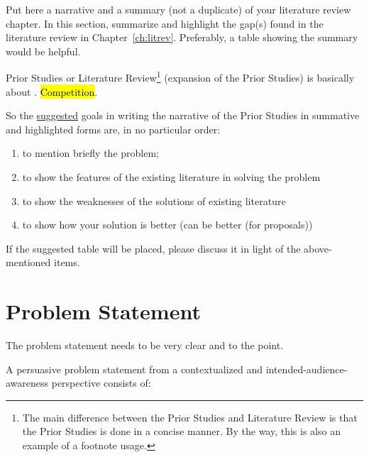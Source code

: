 Put here a narrative and a summary (not a duplicate) of your literature review chapter.  In this section, summarize and highlight the gap(s) found in the literature review in Chapter~\ref{ch:litrev}. Preferably, a table showing the summary would be helpful.

Prior Studies or Literature Review\footnote{The main difference between the Prior Studies and Literature Review is that the Prior Studies is done in a concise manner.  By the way, this is also an example of a footnote usage.} (expansion of the Prior Studies) is basically about . \hl{Competition}.

So the \underline{suggested} goals in writing the narrative of the Prior Studies in summative and highlighted forms  are, in no particular order:

\begin{enumerate}
	\item to mention briefly the problem;

	\item to show the features of the existing literature in solving the problem

	\item to show the weaknesses of the solutions of existing literature

	\item to show how your solution is better (can be better (for proposals))
\end{enumerate}

\noindent If the suggested table will be placed, please discuss it in light of the above-mentioned items.

 \graytx{\blindtext}


\section{Problem Statement}

The problem statement needs to be very clear and to the point.

\noindent A persuasive problem statement from a contextualized and intended-audience-awareness perspective consists of:

